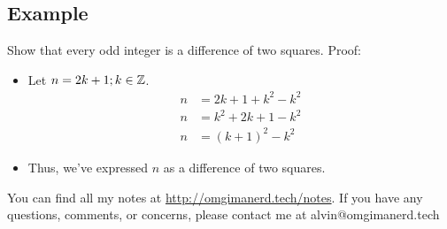 \documentclass[letterpaper, 12pt]{math}
\begin{document}
\subsection*{Example}
Show that every odd integer is a difference of two squares. Proof:
\begin{itemize}
  \item Let \( n = 2k+1; k\in\mathbb{Z} \).
    \begin{align*}
      n &= 2k+1+k^{2}-k^{2} \\
      n &= k^{2}+2k+1-k^{2} \\
      n &= (k+1)^{2}-k^{2}
    \end{align*}
  \item Thus, we've expressed \( n \) as a difference of two squares.
\end{itemize}

\begin{center}
  You can find all my notes at \url{http://omgimanerd.tech/notes}. If you have
  any questions, comments, or concerns, please contact me at
  alvin@omgimanerd.tech
\end{center}
\end{document}
